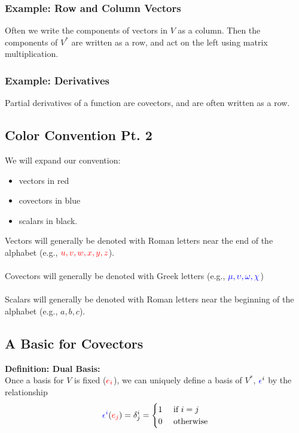 \documentclass[10pt]{article}
\begin{document}
\subsubsection*{Example: Row and Column Vectors}
Often we write the components of vectors in $V$ as a column.  Then the components of $V^*$ are written as a row, and act on the left using matrix multiplication.
\subsubsection*{Example: Derivatives}
Partial derivatives of a function are covectors, and are often written as a row.

\subsection*{Color Convention Pt. 2}
We will expand our convention:
\begin{itemize}
    \item vectors in red
    \item covectors in blue
    \item scalars in black.
\end{itemize}
Vectors will generally be denoted with Roman letters near the end of the alphabet (e.g., $\textcolor{red}{u, v, w, x, y, z}$).\\\\
Covectors will generally be denoted with Greek letters (e.g., $\textcolor{blue}{\mu, \upsilon, \omega, \chi}$)\\\\
Scalars will generally be denoted with Roman letters near the beginning of the alphabet (e.g., $a, b, c$).

\subsection*{A Basic for Covectors}
\textbf{Definition: Dual Basis:}\\
Once a basis for $V$ is fixed ($\textcolor{red}{e_i}$), we can uniquely define a basis of $V^*$, $\textcolor{blue}{\epsilon}^i$ by the relationship
\[\textcolor{blue}{\epsilon^i}(\textcolor{red}{e_j}) = \delta^i_j = \begin{cases} 1 & \text{ if } i = j \\ 0 & \text{ otherwise}\end{cases}\]
\end{document}
